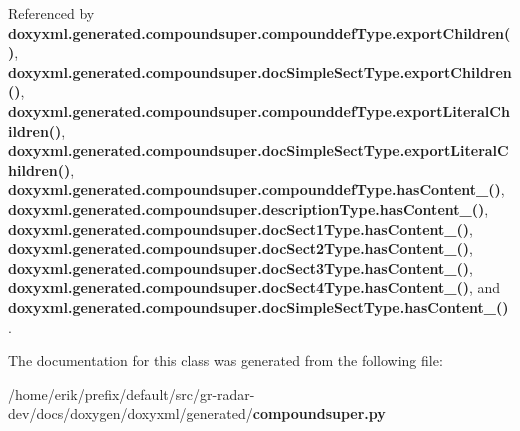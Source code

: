 Referenced by {\bf doxyxml.\+generated.\+compoundsuper.\+compounddef\+Type.\+export\+Children()}, {\bf doxyxml.\+generated.\+compoundsuper.\+doc\+Simple\+Sect\+Type.\+export\+Children()}, {\bf doxyxml.\+generated.\+compoundsuper.\+compounddef\+Type.\+export\+Literal\+Children()}, {\bf doxyxml.\+generated.\+compoundsuper.\+doc\+Simple\+Sect\+Type.\+export\+Literal\+Children()}, {\bf doxyxml.\+generated.\+compoundsuper.\+compounddef\+Type.\+has\+Content\+\_\+()}, {\bf doxyxml.\+generated.\+compoundsuper.\+description\+Type.\+has\+Content\+\_\+()}, {\bf doxyxml.\+generated.\+compoundsuper.\+doc\+Sect1\+Type.\+has\+Content\+\_\+()}, {\bf doxyxml.\+generated.\+compoundsuper.\+doc\+Sect2\+Type.\+has\+Content\+\_\+()}, {\bf doxyxml.\+generated.\+compoundsuper.\+doc\+Sect3\+Type.\+has\+Content\+\_\+()}, {\bf doxyxml.\+generated.\+compoundsuper.\+doc\+Sect4\+Type.\+has\+Content\+\_\+()}, and {\bf doxyxml.\+generated.\+compoundsuper.\+doc\+Simple\+Sect\+Type.\+has\+Content\+\_\+()}.



The documentation for this class was generated from the following file\+:\begin{DoxyCompactItemize}
\item 
/home/erik/prefix/default/src/gr-\/radar-\/dev/docs/doxygen/doxyxml/generated/{\bf compoundsuper.\+py}\end{DoxyCompactItemize}

